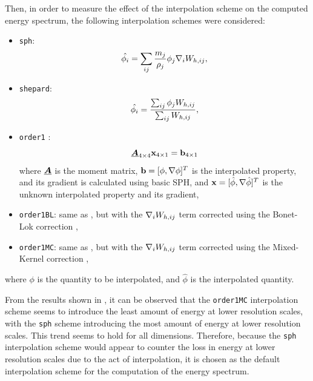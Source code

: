 Then, in order to measure the effect of the interpolation scheme on the computed energy spectrum, the following interpolation schemes were considered:
\begin{itemize}
    \item \texttt{sph}:
    \begin{equation}
        \hat{\phi_i} = \sum_{ij} \frac{m_j}{\rho_j} \phi_j \nabla_{i} W_{h, ij},
    \end{equation}
    
    \item \texttt{shepard}:
    \begin{equation}
        \hat{\phi_i} = \frac{\sum_{ij} \phi_j W_{h, ij}}{\sum_{ij} W_{h, ij}},
    \end{equation}

    \item \texttt{order1} \parencite{Liu2006}:
    \begin{equation}
      \underline{\bm{A}}_{4 \times 4} \mathbf{x}_{4 \times 1} = \mathbf{b}_{4 \times 1}
      \label{eq:interp-order1}
    \end{equation}
    where $\underline{\bm{A}}$ is the moment matrix, $\mathbf{b} = [\phi, \nabla \phi]^T$ is the interpolated property, and its gradient is calculated using basic SPH, and $\mathbf{x} = [\hat{\phi}, \nabla \hat{\phi}]^T$ is the unknown interpolated property and its gradient,

    \item \texttt{order1BL}: same as , but with the $\nabla_{i} W_{h, ij}$ term corrected using the Bonet-Lok correction \parencite{bonet1999variational},

    \item \texttt{order1MC}: same as , but with the $\nabla_{i} W_{h, ij}$ term corrected using the Mixed-Kernel correction \parencite{bonet1999variational},
\end{itemize}
where $\phi$ is the quantity to be interpolated, and $\hat{\phi}$ is the interpolated quantity.

From the results shown in , it can be observed that the \texttt{order1MC} interpolation scheme seems to introduce the least amount of energy at lower resolution scales, with the \texttt{sph} scheme introducing the most amount of energy at lower resolution scales. This trend seems to hold for all dimensions.
Therefore, because the \texttt{sph} interpolation scheme would appear to counter the loss in energy at lower resolution scales due to the act of interpolation, it is chosen as the default interpolation scheme for the computation of the energy spectrum.

